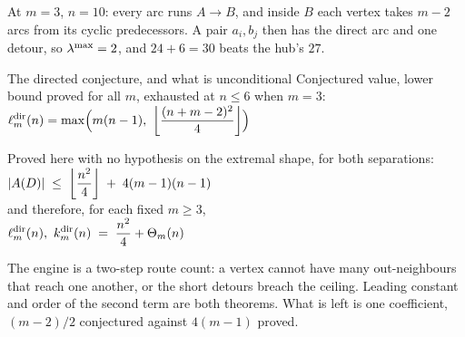 \documentclass[aspectratio=1610,11pt]{beamer}
\begin{document}
  {\figaugmentedwall}
  {At $m=3$, $n=10$: every arc runs $A\to B$, and inside $B$ each vertex takes $m-2$ arcs from its cyclic predecessors. A pair $a_i,b_j$ then has the direct arc and one detour, so $\lambda^{\max}=2$, and $24+6=30$ beats the hub's $27$.}

\begin{frame}{The directed conjecture, and what is unconditional}
\vfill
\centering
{\color{black!45}\small Conjectured value, lower bound proved for all $m$, exhausted at $n\le6$ when $m=3$:}\\[6pt]
{\color{stConj}\large $\displaystyle \ell_m^{\dir}(n)=\max\Bigl(m(n-1),\ \floorfrac{(n+m-2)^2}{4}\Bigr)$}

\vspace{18pt}
{\color{black!45}\small Proved here with no hypothesis on the extremal shape, for both separations:}\\[6pt]
{\color{KULblauw1}\large $\displaystyle |A(D)| \;\le\; \left\lfloor \frac{n^2}{4}\right\rfloor \;+\; 4(m-1)(n-1)$}\\[8pt]
{\color{black!45}\small and therefore, for each fixed $m\ge3$,}\\[6pt]
{\color{KULblauw1}\large $\displaystyle \ell_m^{\dir}(n),\ k_m^{\dir}(n) \;=\; \frac{n^2}{4}+\Theta_m(n)$}

\vspace{14pt}
\begin{minipage}{0.88\textwidth}
{\footnotesize\color{black!60} The engine is a two-step route count: a vertex cannot have many out-neighbours that reach one another, or the short detours breach the ceiling. Leading constant and order of the second term are both theorems. What is left is one coefficient, $(m-2)/2$ conjectured against $4(m-1)$ proved.}
\end{minipage}
\vfill
\end{frame}
\end{document}
